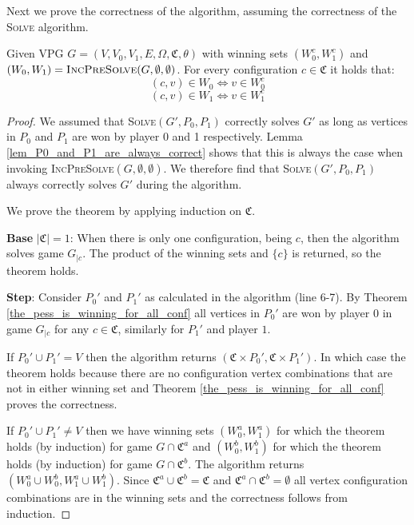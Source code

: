 Next we prove the correctness of the algorithm, assuming the correctness of the \textsc{Solve} algorithm.
\begin{theorem}
	Given VPG ${G} = ({V},{V}_0,{V}_1,{E},{\Omega},\mathfrak{C},\theta)$ with winning sets $({W}_0^c, {W}_1^c)$ and $(W_0,W_1) = \textsc{IncPreSolve}({G},\emptyset,\emptyset)$. For every configuration $c \in \mathfrak{C}$ it holds that:
	\[ (c,v) \in W_0 \iff v \in {W}_0^c \]
	\[ (c,v) \in W_1 \iff v \in {W}_1^c \]
	\begin{proof}
		We assumed that \textsc{Solve}$(G',P_0,P_1)$ correctly solves $G'$ as long as vertices in $P_0$ and $P_1$ are won by player 0 and 1 respectively. Lemma \ref{lem_P0_and_P1_are_always_correct} shows that this is always the case when invoking \textsc{IncPreSolve}$({G},\emptyset,\emptyset)$. We therefore find that \textsc{Solve}$(G',P_0,P_1)$ always correctly solves $G'$ during the algorithm.
		
		We prove the theorem by applying induction on $\mathfrak{C}$.
		
		\textbf{Base} $|\mathfrak{C}| = 1$: When there is only one configuration, being $c$, then the algorithm solves game $G_{|c}$. The product of the winning sets and $\{c\}$ is returned, so the theorem holds.
		
		\textbf{Step}: Consider $P_0'$ and $P_1'$ as calculated in the algorithm (line 6-7). By Theorem \ref{the_pess_is_winning_for_all_conf} all vertices in $P_0'$ are won by player $0$ in game $G_{|c}$ for any $c \in \mathfrak{C}$, similarly for $P_1'$ and player $1$.
		
		If $P_0' \cup P_1' = V$ then the algorithm returns $(\mathfrak{C} \times P_0',\mathfrak{C} \times P_1')$. In which case the theorem holds because there are no configuration vertex combinations that are not in either winning set and Theorem \ref{the_pess_is_winning_for_all_conf} proves the correctness.
		
		If $P_0' \cup P_1' \neq V$ then we have winning sets $(W_0^a, W_1^a)$ for which the theorem holds (by induction) for game $G \cap \mathfrak{C}^a$ and $(W_0^b, W_1^b)$ for which the theorem holds (by induction) for game $G \cap \mathfrak{C}^b$. The algorithm returns $(W_0^a \cup W_0^b, W_1^a \cup W_1^b)$. Since $\mathfrak{C}^a \cup \mathfrak{C}^b = \mathfrak{C}$ and $\mathfrak{C}^a \cap \mathfrak{C}^b = \emptyset$ all vertex configuration combinations are in the winning sets and the correctness follows from induction.
	\end{proof}
\end{theorem}

